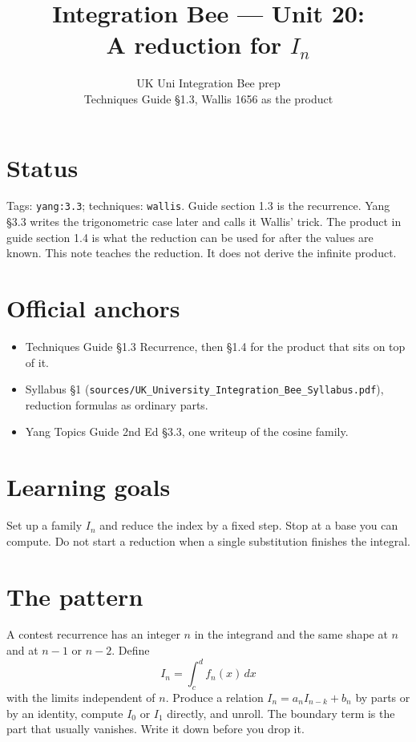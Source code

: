 
\title{Integration Bee --- Unit 20:\\ A reduction for $I_n$}
\author{UK Uni Integration Bee prep\\ Techniques Guide \S1.3, Wallis 1656 as the product}
\date{}

\maketitle
\section*{Status}
Tags: \texttt{yang:3.3}; techniques: \texttt{wallis}.
Guide section 1.3 is the recurrence. Yang \S3.3 writes the trigonometric case later and calls it Wallis' trick. The product in guide section 1.4 is what the reduction can be used for after the values are known. This note teaches the reduction. It does not derive the infinite product.
\section{Official anchors}
\begin{itemize}
\item Techniques Guide \S1.3 Recurrence, then \S1.4 for the product that sits on top of it.
\item Syllabus \S1 (\texttt{sources/UK\_University\_Integration\_Bee\_Syllabus.pdf}), reduction formulas as ordinary parts.
\item Yang Topics Guide 2nd Ed \S3.3, one writeup of the cosine family.
\end{itemize}
\section{Learning goals}
Set up a family $I_n$ and reduce the index by a fixed step.
Stop at a base you can compute. Do not start a reduction when a single substitution finishes the integral.

\section{The pattern}
A contest recurrence has an integer $n$ in the integrand and the same shape at $n$ and at $n-1$ or $n-2$. Define
\[
I_n=\int_c^d f_n(x)\,dx
\]
with the limits independent of $n$. Produce a relation $I_n = a_n I_{n-k}+b_n$ by parts or by an identity, compute $I_0$ or $I_1$ directly, and unroll. The boundary term is the part that usually vanishes. Write it down before you drop it.

